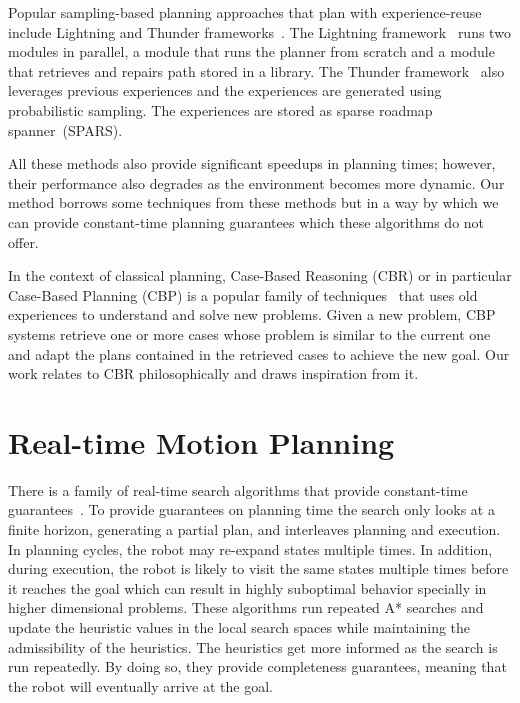\documentclass[a4paper]{report}
\begin{document}
Popular sampling-based planning approaches that plan with experience-reuse include Lightning and Thunder frameworks~\cite{BAG12, CSMOC15}. The Lightning framework~\cite{BAG12} runs two modules in parallel, a module that runs the planner from scratch and a module that retrieves and repairs path stored in a library. The Thunder framework~\cite{CSMOC15} also leverages previous experiences and the experiences are generated using probabilistic sampling. The experiences are stored as sparse roadmap spanner~(SPARS). 

All these methods also provide significant speedups in planning times; however, their performance also degrades as the environment becomes more dynamic. Our method borrows some techniques from these methods but in a way by which we can provide constant-time planning guarantees which these algorithms do not offer.

In the context of classical planning, Case-Based Reasoning (CBR) or in particular Case-Based Planning (CBP) is a popular family of techniques~\cite{kolodner1992introduction, hammond1986chef, hammond2012case} that uses old experiences to understand and solve new problems. Given a new problem, CBP systems retrieve one or more cases whose problem is similar to the current one and adapt the plans contained in the retrieved cases to achieve the new goal. Our work relates to CBR philosophically and draws inspiration from it.

\section{Real-time Motion Planning}
\label{rel:real}
There is a family of real-time search algorithms that provide constant-time guarantees~\cite{KL06,KS09,K90,bjornsson2009tba}.
	To provide guarantees on planning time the search only looks at a finite horizon, generating a partial plan, and interleaves planning and execution. In planning cycles, the robot may re-expand states multiple times. In addition, during execution, the robot is likely to visit the same states multiple times before it reaches the goal which can result in highly suboptimal behavior specially in higher dimensional problems. These algorithms run repeated A* searches and update the heuristic values in the local search spaces while maintaining the admissibility of the heuristics. The heuristics get more informed as the search is run repeatedly. By doing so, they provide completeness guarantees, meaning that the robot will eventually arrive at the goal.
\end{document}
